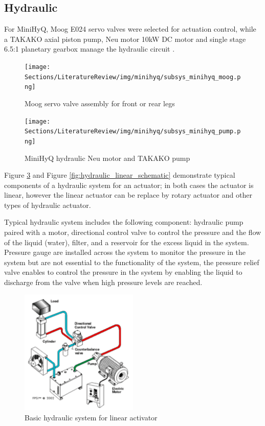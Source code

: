 \subsection{Hydraulic} \label{app:hydraulic}

For MiniHyQ, Moog E024 servo valves were selected for actuation control, while a TAKAKO axial piston pump, Neu motor 10kW DC motor and single stage 6.5:1 planetary gearbox manage the hydraulic circuit \cite{khan_development_2015-1}.

\begin{figure}[H]
    \centering
    \texttt{[image: Sections/LiteratureReview/img/minihyq/subsys\_minihyq\_moog.png]}
    \caption{Moog servo valve assembly for front or rear legs \cite{khan_development_2015-1}}
    \label{fig:minihyq_hydraulic_moog}
\end{figure}

\begin{figure}[H]
    \centering
    \texttt{[image: Sections/LiteratureReview/img/minihyq/subsys\_minihyq\_pump.png]}
    \caption{MiniHyQ hydraulic Neu motor and TAKAKO pump \cite{khan_development_2015-1}}
    \label{fig:minihyq_hydraulic_pump}
\end{figure}

Figure \ref{fig:hydraulic_linear_system} and Figure \ref{fig:hydraulic_linear_schematic} demonstrate typical components of a hydraulic system for an actuator; in both cases the actuator is linear, however the linear actuator can be replace by rotary actuator and other types of hydraulic actuator. 

Typical hydraulic system includes the following component: hydraulic pump paired with a motor, directional control valve to control the pressure and the flow of the liquid (water), filter, and a reservoir for the excess liquid in the system. Pressure gauge are installed across the system to monitor the pressure in the system but are not essential to the functionality of the system, the pressure relief valve enables to control the pressure in the system by enabling the liquid to discharge from the valve when high pressure levels are reached.

\begin{figure}[H]
    \centering
    \includegraphics[width=0.5\textwidth]{Sections/LiteratureReview/img/drive/Hydraulic_linear_actuator.png}
    \caption{Basic hydraulic system for linear activator \cite{fluid_power_safety_fluid_nodate}}
    \label{fig:hydraulic_linear_system}
\end{figure}


